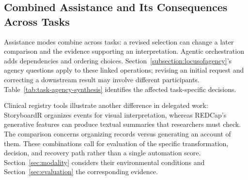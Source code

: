 \subsection{Combined Assistance and Its Consequences Across Tasks}
\label{sec:assistance-overlap}
\label{sec:tasks-synthesis}

Assistance modes combine across tasks: a revised selection can change a later comparison and the evidence supporting an interpretation. Agentic orchestration adds dependencies and ordering choices. Section~\ref{subsection:locusofagency}'s agency questions apply to these linked operations; revising an initial request and correcting a downstream result may involve different participants. Table~\ref{tab:task-agency-synthesis} identifies the affected task-specific decisions.

Clinical registry tools illustrate another difference in delegated work: StoryboardR organizes events for visual interpretation, whereas REDCap's generative features can produce textual summaries that researchers must check.~\cite{MillerShalhout2023StoryboardR,Shyr2026REDCapAI} The comparison concerns organizing records versus generating an account of them. These combinations call for evaluation of the specific transformation, decision, and recovery path rather than a single automation score. Section~\ref{sec:modality} considers their environmental conditions and Section~\ref{sec:evaluation} the corresponding evidence.
